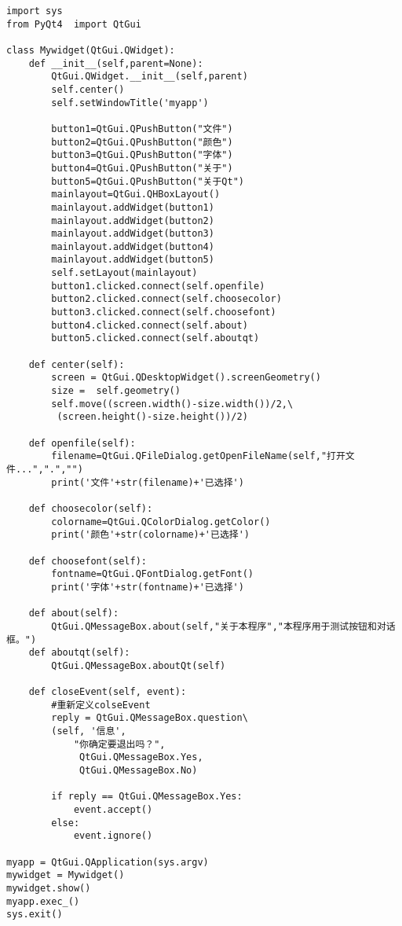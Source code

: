 \documentclass[12pt,oneside]{book}
\begin{document}
\begin{common-format}
\begin{Verbatim}
import sys
from PyQt4  import QtGui

class Mywidget(QtGui.QWidget):
    def __init__(self,parent=None):
        QtGui.QWidget.__init__(self,parent)
        self.center()
        self.setWindowTitle('myapp')

        button1=QtGui.QPushButton("文件")
        button2=QtGui.QPushButton("颜色")
        button3=QtGui.QPushButton("字体")
        button4=QtGui.QPushButton("关于")
        button5=QtGui.QPushButton("关于Qt")
        mainlayout=QtGui.QHBoxLayout()
        mainlayout.addWidget(button1)
        mainlayout.addWidget(button2)
        mainlayout.addWidget(button3)
        mainlayout.addWidget(button4)
        mainlayout.addWidget(button5)
        self.setLayout(mainlayout)
        button1.clicked.connect(self.openfile)
        button2.clicked.connect(self.choosecolor)
        button3.clicked.connect(self.choosefont)
        button4.clicked.connect(self.about)
        button5.clicked.connect(self.aboutqt)

    def center(self):
        screen = QtGui.QDesktopWidget().screenGeometry()
        size =  self.geometry()
        self.move((screen.width()-size.width())/2,\
         (screen.height()-size.height())/2)

    def openfile(self):
        filename=QtGui.QFileDialog.getOpenFileName(self,"打开文件...",".","")
        print('文件'+str(filename)+'已选择')

    def choosecolor(self):
        colorname=QtGui.QColorDialog.getColor()
        print('颜色'+str(colorname)+'已选择')

    def choosefont(self):
        fontname=QtGui.QFontDialog.getFont()
        print('字体'+str(fontname)+'已选择')

    def about(self):
        QtGui.QMessageBox.about(self,"关于本程序","本程序用于测试按钮和对话框。")
    def aboutqt(self):
        QtGui.QMessageBox.aboutQt(self)

    def closeEvent(self, event):
        #重新定义colseEvent
        reply = QtGui.QMessageBox.question\
        (self, '信息',
            "你确定要退出吗？",
             QtGui.QMessageBox.Yes,
             QtGui.QMessageBox.No)

        if reply == QtGui.QMessageBox.Yes:
            event.accept()
        else:
            event.ignore()

myapp = QtGui.QApplication(sys.argv)
mywidget = Mywidget()
mywidget.show()
myapp.exec_()
sys.exit()
\end{Verbatim}


\end{common-format}
\end{document}
